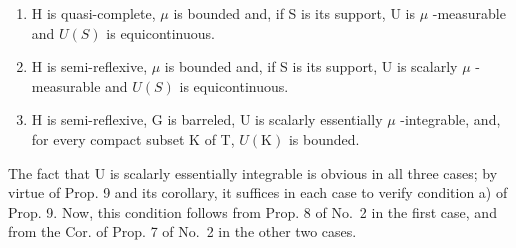 \begin{enumerate}
\def\labelenumi{\alph{enumi})}
\item
  H is quasi-complete, \(\mu\) is bounded and, if S is its support, U is \(\mu\) -measurable and \(U(S)\) is equicontinuous.
\item
  H is semi-reflexive, \(\mu\) is bounded and, if S is its support, U is scalarly \(\mu\) -measurable and \(U(S)\) is equicontinuous.
\item
  H is semi-reflexive, G is barreled, U is scalarly essentially \(\mu\) -integrable, and, for every compact subset K of T, \(U(\mathrm{K})\) is bounded.
\end{enumerate}

The fact that U is scalarly essentially integrable is obvious in all three cases; by virtue of Prop. 9 and its corollary, it suffices in each case to verify condition a) of Prop. 9. Now, this condition follows from Prop. 8 of No.~2 in the first case, and from the Cor. of Prop. 7 of No.~2 in the other two cases.

